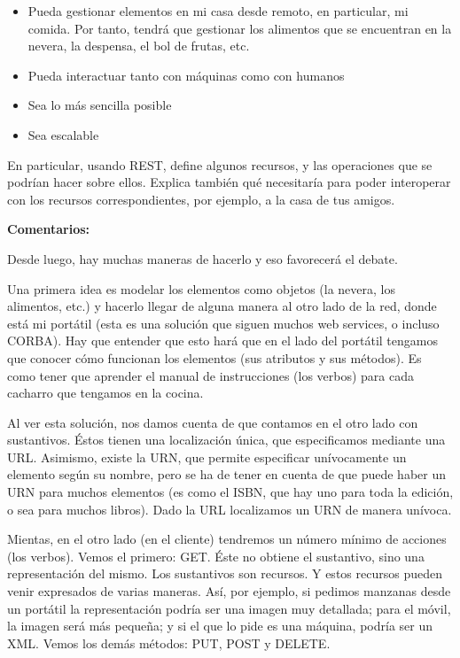 \begin{itemize}
\item Pueda gestionar elementos en mi casa desde remoto, en particular, mi comida. Por tanto, tendrá que gestionar los alimentos que se encuentran en la nevera, la despensa, el bol de frutas, etc.
\item Pueda interactuar tanto con máquinas como con humanos
\item Sea lo más sencilla posible
\item Sea escalable
\end{itemize}

En particular, usando REST, define algunos recursos, y las operaciones que se podrían hacer sobre ellos. Explica también qué necesitaría para poder interoperar con los recursos correspondientes, por ejemplo, a la casa de tus amigos.

\textbf{Comentarios:}

Desde luego, hay muchas maneras de hacerlo y eso favorecerá el debate.

Una primera idea es modelar los elementos como objetos (la nevera, los alimentos, etc.) y hacerlo llegar de alguna manera al otro lado de la red, donde está mi portátil (esta es una solución que siguen muchos web services, o incluso CORBA). Hay que entender que esto hará que en el lado del portátil tengamos que conocer cómo funcionan los elementos (sus atributos y sus métodos). Es como tener que aprender el manual de instrucciones (los verbos) para cada cacharro que tengamos en la cocina.

Al ver esta solución, nos damos cuenta de que contamos en el otro lado con sustantivos. Éstos tienen una localización única, que especificamos mediante una URL. Asimismo, existe la URN, que permite especificar unívocamente un elemento según su nombre, pero se ha de tener en cuenta de que puede haber un URN para muchos elementos (es como el ISBN, que hay uno para toda la edición, o sea para muchos libros). Dado la URL localizamos un URN de manera unívoca.

Mientas, en el otro lado (en el cliente) tendremos un número mínimo de acciones (los verbos). Vemos el primero: GET. Éste no obtiene el sustantivo, sino una representación del mismo. Los sustantivos son recursos. Y estos recursos pueden venir expresados de varias maneras. Así, por ejemplo, si pedimos manzanas desde un portátil la representación podría ser una imagen muy detallada; para el móvil, la imagen será más pequeña; y si el que lo pide es una máquina, podría ser un XML. Vemos los demás métodos: PUT, POST y DELETE.

